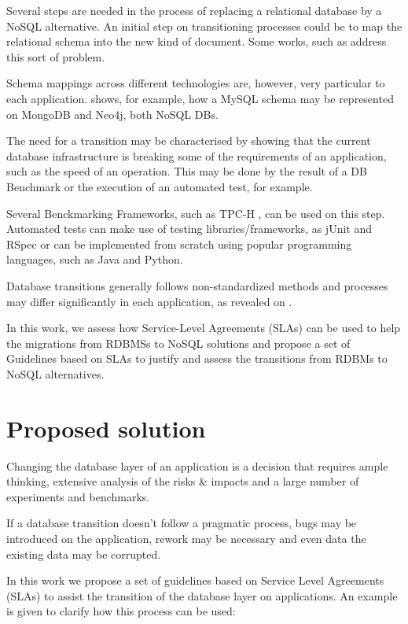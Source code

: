Several steps are needed in the process of replacing a relational database by a NoSQL alternative. An initial step on transitioning processes could be to map the relational schema into the new kind of document. Some works, such as \cite{lombardo2012issues} \cite{zhu2012data} address this sort of problem. 

Schema mappings across different technologies are, however, very particular to each application. \cite{bahl2014mysql} shows, for example, how a MySQL schema may be represented on MongoDB and Neo4j, both NoSQL DBs.

The need for a transition may be characterised by showing that the current database infrastructure is breaking some of the requirements of an application, such as the speed of an operation. This may be done by the result of a DB Benchmark or the execution of an automated test, for example. 

Several Benckmarking Frameworks, such as TPC-H \cite{council2008tpc}, can be used on this step. Automated tests can make use of testing libraries/frameworks, as jUnit \cite{massol2003junit} and RSpec \cite{chelimsky2010rspec} or can be implemented from scratch using popular programming languages, such as Java and Python.

Database transitions generally follows non-standardized methods and processes may differ significantly in each application, as revealed on \cite{fabioMartinSM}.

In this work, we assess how Service-Level Agreements (SLAs) can be used to help the migrations from RDBMSs to NoSQL solutions and propose a set of Guidelines based on SLAs to justify and assess the transitions from RDBMs to NoSQL alternatives.



\section{Proposed solution}

Changing the database layer of an application is a decision that requires ample thinking, extensive analysis of the risks \& impacts and a large number of experiments and benchmarks. 

If a database transition doesn't follow a pragmatic process, bugs may be introduced on the application, rework may be necessary and even data the existing data may be corrupted.

In this work we propose a set of guidelines based on Service Level Agreements (SLAs) to assist the transition of the database layer on applications. An example is given to clarify how this process can be used:


